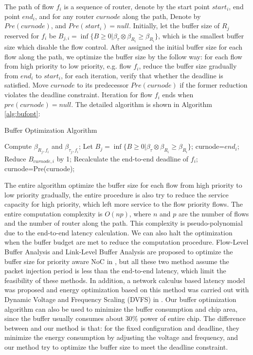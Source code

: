 \documentclass[10pt,journal]{IEEEtran}
\begin{document}
The path of flow $f_i$ is a sequence of router, denote by the start point $start_i$, end point $end_i$, and for any router $curnode$ along the path, Denote by $Pre(curnode)$, and $Pre(start_i)=null$. Initially, let the buffer size of $R_j$ reserved for $f_i$ be $B_{j,i}=\inf\{B\geq 0|\beta_{\tau}\otimes\beta_{R_i}\geq \beta_{R_i}\}$, which is the smallest buffer size which disable the flow control. After assigned the initial buffer size for each flow along the path, we optimize the buffer size by the follow way: for each flow from high priority to low priority, e.g. flow $f_i$, reduce the buffer size gradually from $end_i$ to $start_i$, for each iteration, verify that whether the deadline is satisfied. Move $curnode$ to its predecessor $Pre(curnode)$ if the former reduction violates the deadline constraint. Iteration for flow $f_i$ ends when $pre(curnode)=null$. The detailed algorithm is shown in Algorithm \ref{alg:bufopt}:
\begin{algorithm}
\caption{Buffer Optimization Algorithm}
\label{alg:bufopt}
\begin{algorithmic}[1]
        \STATE Compute $\beta_{R_j,f_i}$ and $\beta_{\tau_j,f_i}$;
        \STATE Let $B_j=\inf\{B\geq 0|\beta_{\tau}\otimes\beta_{R_i}\geq \beta_{R_i}\}$;
    \ENDFOR
        \STATE curnode=$end_i$;
                \STATE Reduce $B_{curnode,i}$ by 1;
                \STATE Recalculate the end-to-end deadline of $f_i$;
            \ENDWHILE
            curnode=Pre(curnode);
        \ENDWHILE
    \ENDFOR
\end{algorithmic}
\end{algorithm}

The entire algorithm optimize the buffer size for each flow from high priority to low priority gradually, the entire procedure is also try to reduce the service capacity for high priority, which left more service to the flow priority flows. The entire computation complexity is $O(np)$, where $n$ and $p$ are the number of flows and the number of router along the path. This complexity is pseudo-polynomial due to the end-to-end latency calculation. We can also halt the optimization when the buffer budget are met to reduce the computation procedure. Flow-Level Buffer Analysis and Link-Level Buffer Analysis are proposed to optimize the buffer size for priority aware NoC in \cite{189}, but all these two method assume the packet injection period is less than the end-to-end latency, which limit the feasibility of these methods. In addition, a network calculus based latency model was proposed and energy optimization based on this method was carried out with Dynamic Voltage and Frequency Scaling (DVFS) in \cite{6560630}. Our buffer optimization algorithm can also be used to minimize the buffer consumption and chip area, since the buffer usually consumes about 30\% power of entire chip.  The difference between \cite{6560630} and our method is that: for the fixed configuration and deadline, they minimize the energy consumption by adjusting the voltage and frequency, and our method try to optimize the buffer size to meet the deadline constraint.
\end{document}
